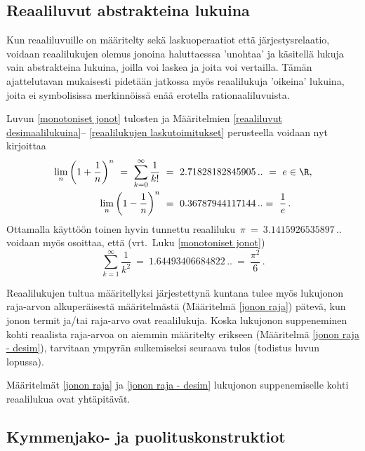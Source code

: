 \subsection{Reaaliluvut abstrakteina lukuina}

Kun reaaliluvuille on määritelty sekä laskuoperaatiot että järjestysrelaatio, voidaan 
reaalilukujen olemus jonoina haluttaesssa 'unohtaa' ja käsitellä lukuja vain abstrakteina 
lukuina, joilla voi laskea ja joita voi vertailla. Tämän ajattelutavan mukaisesti pidetään
jatkossa myös reaalilukuja 'oikeina' lukuina, joita ei symbolisissa merkinnöissä enää
erotella rationaaliluvuista. 
\begin{Exa} \label{kertausesimerkkejä} Luvun \ref{monotoniset jonot} tulosten ja 
Määritelmien \ref{reaaliluvut desimaalilukuina}-- \ref{reaalilukujen laskutoimitukset}
perusteella voidaan nyt kirjoittaa
\begin{align*}
\lim_n \left(1 + \dfrac{1}{n}\right)^n\ =\ \sum_{k=0}^\infty \frac{1}{k!}\    
                                           &= \ 2.71828182845905\,..\ = \ e\in\R, \\ 
\lim_n \left(1 - \dfrac{1}{n}\right)^n\    &= \ 0.36787944117144\,..  = \ \frac{1}{e}\,.
\end{align*}
Ottamalla käyttöön toinen hyvin tunnettu reaaliluku $\,\pi\ =\ 3.1415926535897\,..$ voidaan
myös osoittaa, että (vrt.\ Luku \ref{monotoniset jonot})
\[
\sum_{k=1}^\infty \dfrac{1}{k^2}\ = \ 1.64493406684822\,..\ = \ \frac{\pi^2}{6}\,.
\]
\end{Exa}
Reaalilukujen tultua määritellyksi järjestettynä kuntana tulee myös lukujonon raja-arvon 
alkuperäisestä määritelmästä (Määritelmä \ref{jonon raja}) pätevä, kun jonon termit ja/tai 
raja-arvo ovat reaalilukuja. Koska lukujonon suppeneminen kohti reaalista raja-arvoa on
aiemmin määritelty erikseen (Määritelmä \ref{jonon raja - desim}), tarvitaan ympyrän
sulkemiseksi seuraava tulos (todistus luvun lopussa).
\begin{*Lause} \label{suppeneminen kohti reaalilukua} Määritelmät \ref{jonon raja} ja 
\ref{jonon raja - desim} lukujonon suppenemiselle kohti reaalilukua ovat yhtäpitävät. 
\end{*Lause}

\subsection{Kymmenjako- ja puolituskonstruktiot}

